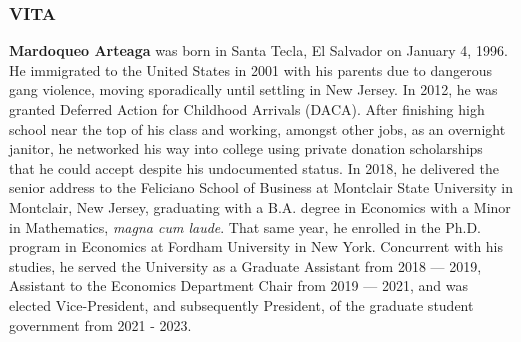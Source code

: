 
\begin{center}
\subsubsection*{VITA}
\end{center}


\textbf{Mardoqueo Arteaga} was born in Santa Tecla, El Salvador on January 4, 1996. He immigrated to the United States in 2001 with his parents due to dangerous gang violence, moving sporadically until settling in New Jersey. In 2012, he was granted Deferred Action for Childhood Arrivals (DACA). After finishing high school near the top of his class and working, amongst other jobs, as an overnight janitor, he networked his way into college using private donation scholarships that he could accept despite his undocumented status. In 2018, he delivered the senior address to the Feliciano School of Business at Montclair State University in Montclair, New Jersey, graduating with a B.A. degree in Economics with a Minor in Mathematics, \emph{magna cum laude}. That same year, he enrolled in the Ph.D. program in Economics at Fordham University in New York. Concurrent with his studies, he served the University as a Graduate Assistant from 2018 --- 2019, Assistant to the Economics Department Chair from 2019 --- 2021, and was elected Vice-President, and subsequently President, of the graduate student government from 2021 - 2023. 
